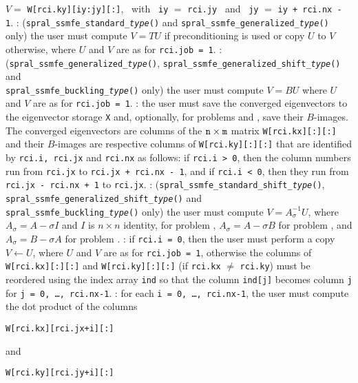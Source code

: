\begin{description}
\begin{description}
\hspace{8mm}
$V=$ {\tt W[rci.ky][iy:jy][:]},
~with~ {\tt iy} $=$ {\tt rci.jy} 
~and~
{\tt jy} $=$ {\tt iy + rci.nx - 1}.
%
:
({\tt spral\_ssmfe\_standard\_\textit{type}()} and {\tt spral\_ssmfe\_generalized\_\textit{type}()} only)
the user must
compute $V = T U$ if preconditioning is used
or copy $U$ to $V$ otherwise,
where $U$ and $V$ are as for {\tt rci.job = 1}.
%
:
({\tt spral\_ssmfe\_generalized\_\textit{type}()},
 {\tt spral\_ssmfe\_generalized\_shift\_\textit{type}()} and\\
 {\tt spral\_ssmfe\_buckling\_\textit{type}()} only)
the user must compute $V = B U$ 
where $U$ and $V$ are as for {\tt rci.job = 1}.
%
: the user must save the converged eigenvectors
to the eigenvector storage {\tt X}
and, optionally, 
for problems  and ,
save their $B$-images.
The converged eigenvectors are columns of the ${\tt n}\times {\tt m}$ matrix
{\tt W[rci.kx][:][:]} and their $B$-images are respective columns of
{\tt W[rci.ky][:][:]}
that are identified by
{\tt rci.i, rci.jx} and {\tt rci.nx}
as follows:
if {\tt rci.i > 0}, then the column numbers
run from {\tt rci.jx} to {\tt rci.jx + rci.nx - 1},
and if {\tt rci.i < 0}, then they run
from {\tt rci.jx - rci.nx + 1} to {\tt rci.jx}.
%
:
({\tt spral\_ssmfe\_standard\_shift\_\textit{type}()},
 {\tt spral\_ssmfe\_generalized\_shift\_\textit{type}()} and\\
 {\tt spral\_ssmfe\_buckling\_\textit{type}()} only)
the user must compute $V = A_\sigma^{-1} U$, where
$A_\sigma = A - \sigma I$
and $I$ is $n\times n$ identity,
for problem , 
$A_\sigma = A - \sigma B$ for problem ,
and 
$A_\sigma = B - \sigma A$ for problem .
%
:
if {\tt rci.i = 0}, then
the user  must perform a copy $V \leftarrow U$, 
where $U$ and $V$ are as for {\tt rci.job = 1},
otherwise the columns of {\tt W[rci.kx][:][:]}
and {\tt W[rci.ky][:][:]}
(if {\tt rci.kx} $\not=$ {\tt rci.ky}) 
must be reordered using
the index array {\tt ind} so that %
the column {\tt ind[j]} becomes column {\tt j}
for {\tt j = 0, \ldots, rci.nx-1}.
%
:
for each
{\tt i = 0, \ldots, rci.nx-1}, 
the user must compute the dot product of
the columns 

\hspace{8mm}
{\tt W[rci.kx][rci.jx+i][:]} 

and

\hspace{8mm}
{\tt W[rci.ky][rci.jy+i][:]}


\end{description}
\end{description}

